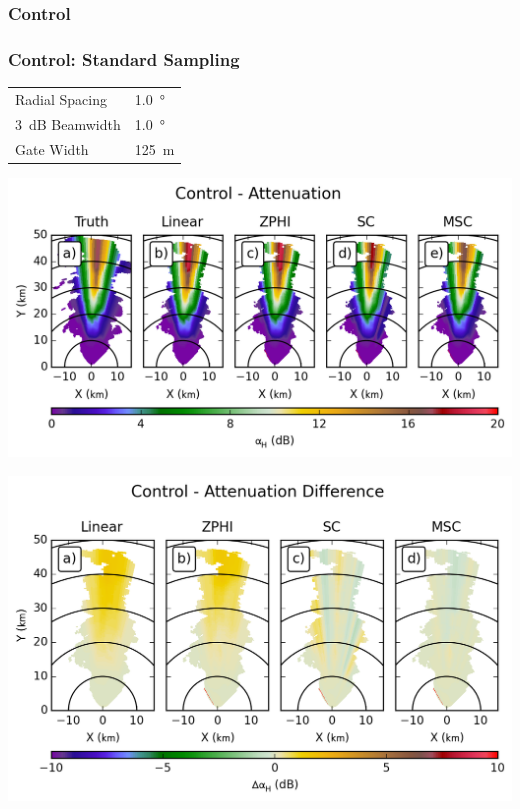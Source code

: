 \documentclass[red]{beamer}
\begin{document}
\subsubsection{Control}
\begin{frame}
	\frametitle{Control: Standard Sampling}
	\begin{center}
	    \begin{tabular}{ | l | l | }
	        \hline
	        Radial Spacing & \SI{1.0}{\degree} \\
	        \SI{3}{dB} Beamwidth & \SI{1.0}{\degree} \\
	        Gate Width & \SI{125}{\meter} \\
			\hline
	    \end{tabular}
	\end{center}	
\end{frame}

\begin{frame}
    \begin{center}
        \includegraphics[scale=0.7]{figures/spatial/C_Control_Attenuation_H}
    \end{center}
\end{frame}

\begin{frame}
    \begin{center}
        \includegraphics[scale=0.7]{figures/spatial/C_Control_Attenuation_Difference_H}
    \end{center}
\end{frame}
\end{document}
